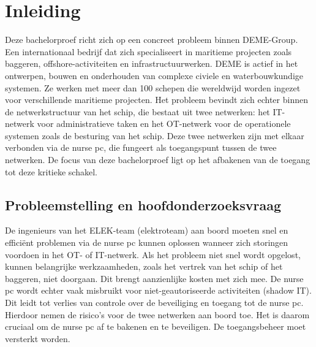 


% 

\section{Inleiding}%
\label{sec:inleiding}
Deze bachelorproef richt zich op een concreet probleem binnen DEME-Group. Een internationaal bedrijf dat zich specialiseert in maritieme projecten zoals baggeren, offshore-activiteiten en infrastructuurwerken. 
DEME is actief in het ontwerpen, bouwen en onderhouden van complexe civiele en waterbouwkundige systemen. Ze werken met meer dan 100 schepen die wereldwijd worden ingezet voor verschillende maritieme projecten.
Het probleem bevindt zich echter binnen de netwerkstructuur van het schip, die bestaat uit twee netwerken: 
het IT-netwerk voor administratieve taken en het OT-netwerk voor de operationele systemen zoals de besturing van het schip. Deze twee netwerken zijn met elkaar verbonden via de nurse pc, die fungeert 
als toegangspunt tussen de twee netwerken. De focus van deze bachelorproef ligt op het afbakenen van de toegang tot deze kritieke schakel.

\subsection{Probleemstelling en hoofdonderzoeksvraag}
De ingenieurs van het ELEK-team (elektroteam) aan boord moeten snel en efficiënt problemen via de nurse pc kunnen oplossen wanneer zich storingen voordoen in het OT- of IT-netwerk. Als het probleem niet snel wordt opgelost, kunnen belangrijke werkzaamheden, 
zoals het vertrek van het schip of het baggeren, niet doorgaan. Dit brengt aanzienlijke kosten met zich mee.
De nurse pc wordt echter vaak misbruikt voor niet-geautoriseerde activiteiten (shadow IT). Dit leidt tot verlies van controle over de beveiliging en toegang tot de nurse pc. 
Hierdoor nemen de risico’s voor de twee netwerken aan boord toe. 
Het is daarom cruciaal om de nurse pc af te bakenen en te beveiligen. De toegangsbeheer moet versterkt worden.

